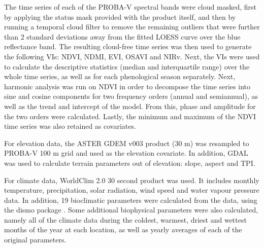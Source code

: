 \documentclass[review,authoryear,3p]{elsarticle}
\begin{document}
The time series of each of the PROBA-V spectral bands were cloud masked, first by applying the status mask provided with the product itself, and then by running a temporal cloud filter to remove the remaining outliers that were further than 2 standard deviations away from the fitted \ac{LOESS} curve over the blue reflectance band.
The resulting cloud-free time series was then used to generate the following \glspl{VI}: \gls{NDVI}, \gls{NDMI}, \gls{EVI}, \gls{OSAVI} and \gls{NIRv}. Next, the \glspl{VI} were used to calculate the descriptive statistics (median and interquartile range) over the whole time series, as well as for each phenological season separately.
Next, harmonic analysis \citep{jakubauskas2001harmonic} was run on NDVI in order to decompose the time series into sine and cosine components for two frequency orders (annual and semiannual), as well as the trend and intercept of the model.
From this, phase and amplitude for the two orders were calculated.
Lastly, the minimum and maximum of the NDVI time series was also retained as covariates.


For elevation data, the ASTER GDEM v003 \citep{ASTGTM003} product (30 m) was resampled to PROBA-V 100 m grid and used as the elevation covariate.
In addition, \gls{GDAL} \citep{gdal} was used to calculate terrain parameters out of elevation: slope, aspect and \ac{TPI}.


For climate data, WorldClim 2.0 30 second product \citep{worldclim2} was used.
It includes monthly temperature, precipitation, solar radiation, wind speed and water vapour pressure data.
In addition, 19 bioclimatic parameters were calculated from the data, using the dismo package \citep{dismo}.
Some additional biophysical parameters were also calculated, namely all of the climate data during the coldest, warmest, driest and wettest months of the year at each location, as well as yearly averages of each of the original parameters.

\end{document}
